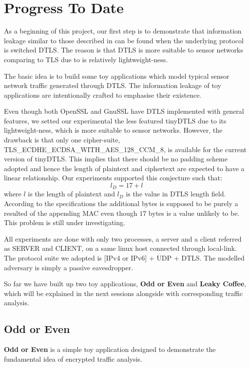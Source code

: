\chapter{Progress To Date}
\label{Chp: Progress To Date}

As a beginning of this project, our first step is to demonstrate that information leakage similar to those described in \cite{Web1} can be found when the underlying protocol is switched DTLS. The reason is that DTLS is more suitable to sensor networks comparing to TLS due to is relatively lightweight-ness. 

The basic idea is to build some toy applications which model typical sensor network traffic generated through DTLS. The information leakage of toy applications are intentionally crafted to emphasise their existence.

Even though both OpenSSL and GnuSSL have DTLS implemented with general features, we setted our experimental the less featured tinyDTLS\cite{tinyDTLS} due to its lightweight-ness, which is more suitable to sensor networks. However, the drawback is that only one cipher-suite, TLS\_ECDHE\_ECDSA\_WITH\_AES\_128\_CCM\_8\cite{rfc7251}, is available for the current version of tinyDTLS. This implies that there should be no padding scheme adopted and hence the length of plaintext and ciphertext are expected to have a linear relationship. Our experiments supported this conjecture such that:
\begin{equation} \label{Eq: Plaintext length}
l_D = 17 + l
\end{equation}
where $l$ is the length of plaintext and $l_D$ is the value in DTLS length field. According to the specifications the additional bytes is supposed to be purely a resulted of the appending MAC even though $17$ bytes is a value unlikely to be. This problem is still under investigating.

All experiments are done with only two processes, a server and a client referred as SERVER and CLIENT, on a same linux host connected through local-link. The protocol suite we adopted is [IPv4 or IPv6] + UDP + DTLS. The modelled adversary is simply a passive eavesdropper.

So far we have built up two toy applications, \textbf{Odd or Even} and \textbf{Leaky Coffee}, which will be explained in the next sessions alongside with corresponding traffic analysis.

\section{Odd or Even}
\textbf{Odd or Even} is a simple toy application designed  to demonstrate the fundamental idea of encrypted traffic analysis.

